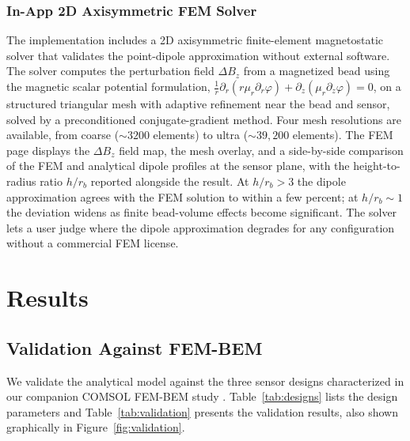 \documentclass[micromachines,article,submit,pdftex,moreauthors]{Definitions/mdpi}
\begin{document}
\subsubsection{In-App 2D Axisymmetric FEM Solver}
\label{sec:fem}

The implementation includes a 2D axisymmetric finite-element magnetostatic solver
that validates the point-dipole approximation without external software. The solver
computes the perturbation field $\Delta B_z$ from a magnetized bead using the
magnetic scalar potential formulation,
$\tfrac{1}{r}\partial_r(r\mu_r\partial_r\varphi) + \partial_z(\mu_r\partial_z\varphi)
= 0$, on a structured triangular mesh with adaptive refinement near the bead and
sensor, solved by a preconditioned conjugate-gradient method. Four mesh resolutions
are available, from coarse (${\sim}3200$ elements) to ultra (${\sim}39{,}200$
elements). The FEM page displays the $\Delta B_z$ field map, the mesh overlay, and a
side-by-side comparison of the FEM and analytical dipole profiles at the sensor
plane, with the height-to-radius ratio $h/r_b$ reported alongside the result. At
$h/r_b > 3$ the dipole approximation agrees with the FEM solution to within a few
percent; at $h/r_b \sim 1$ the deviation widens as finite bead-volume effects become
significant. The solver lets a user judge where the dipole approximation degrades for
any configuration without a commercial FEM license.

\section{Results}
\label{sec:results}

\subsection{Validation Against FEM-BEM}
\label{sec:validation}

We validate the analytical model against the three sensor designs characterized in
our companion COMSOL FEM-BEM study \cite{govindaraju2025}.
Table~\ref{tab:designs} lists the design parameters and Table~\ref{tab:validation}
presents the validation results, also shown graphically in
Figure~\ref{fig:validation}.
\end{document}
